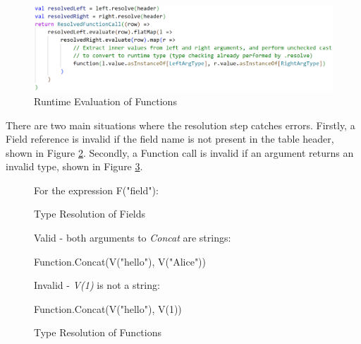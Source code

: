 \begin{figure}[htp]
	\centering
	\includegraphics[width=\textwidth]{chapters/diagrams/implementation/type-resolution-unchecked-casts}
	\caption{Runtime Evaluation of Functions}
	\label{fig:fieldexpression-unchecked-casts}
\end{figure}

There are two main situations where the resolution step catches errors. Firstly, a Field reference is invalid if the field name is not present in the table header, shown in Figure \ref{fig:field-type-resolution}. Secondly, a Function call is invalid if an argument returns an invalid type, shown in Figure \ref{fig:function-type-resolution}.

\begin{figure}[htp]
	\centering
	For the expression F(\textcolor{deepgreen}{"field"}):
	
	\qquad
	\caption{Type Resolution of Fields}
	\label{fig:field-type-resolution}
\end{figure}

\begin{figure}[htp]
	Valid - both arguments to \textit{Concat} are strings:
	\begin{python}
Function.Concat(V("hello"), V("Alice"))
	\end{python}
	
	Invalid - \textit{V(1)} is not a string:
	\begin{python}
Function.Concat(V("hello"), V(1))
	\end{python}
	\caption{Type Resolution of Functions}
	\label{fig:function-type-resolution}
\end{figure}


